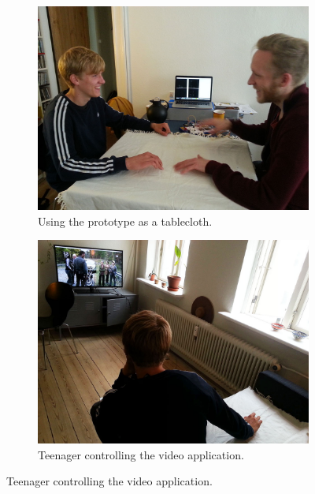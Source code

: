 \begin{figure}[t]
    \centering
    \begin{subfigure}[t]{0.44\textwidth}
        \centering
        \includegraphics[width=\textwidth]{figures/touch/evaluation/sebastian/table}
        \caption{Using the prototype as a tablecloth.}
        \label{fig:textiletouch:eval:sebastian:table}
    \end{subfigure}%
    \hspace{0.02\textwidth}
    \begin{subfigure}[t]{0.44\textwidth}
        \centering
        \includegraphics[width=\textwidth]{figures/touch/evaluation/sebastian/sofa_behind_seb}
        \caption{Teenager controlling the video application.}
        \label{fig:textiletouch:eval:sebastian:sofa_behind}
    \end{subfigure}


\end{figure}
